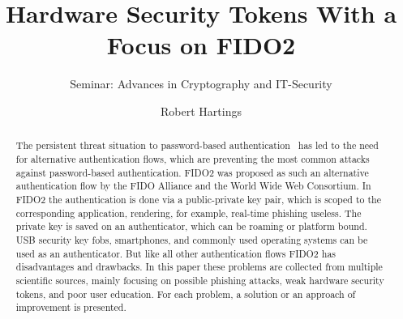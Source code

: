 \documentclass[runningheads]{llncs}
\begin{document}
%
\title{Hardware Security Tokens With a Focus on FIDO2}
\subtitle{Seminar: Advances in Cryptography and IT-Security}
%
%

\author{Robert Hartings}

%
\maketitle              %
\begin{abstract}
The persistent threat situation to password-based authentication~\cite{000006} has led to the need for alternative authentication flows, which are preventing the most common attacks against password-based authentication. FIDO2 was proposed as such an alternative authentication flow by the FIDO Alliance and the World Wide Web Consortium. In FIDO2 the authentication is done via a public-private key pair, which is scoped to the corresponding application, rendering, for example, real-time phishing useless. The private key is saved on an authenticator, which can be roaming or platform bound. USB security key fobs, smartphones, and commonly used operating systems can be used as an authenticator. But like all other authentication flows FIDO2 has disadvantages and drawbacks. In this paper these problems are collected from multiple scientific sources, mainly focusing on possible phishing attacks, weak hardware security tokens, and poor user education. For each problem, a solution or an approach of improvement is presented.

\end{abstract}
%
%
%
\end{document}
